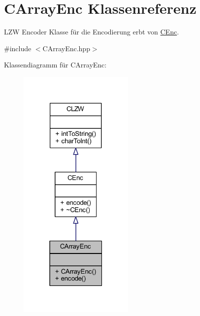 \hypertarget{class_c_array_enc}{}\section{C\+Array\+Enc Klassenreferenz}
\label{class_c_array_enc}


L\+ZW Encoder Klasse für die Encodierung erbt von \hyperlink{class_c_enc}{C\+Enc}.  




{\ttfamily \#include $<$C\+Array\+Enc.\+hpp$>$}



Klassendiagramm für C\+Array\+Enc\+:
\nopagebreak
\begin{figure}[H]
\begin{center}
\leavevmode
\includegraphics[width=159pt]{class_c_array_enc__inherit__graph}
\end{center}
\end{figure}



